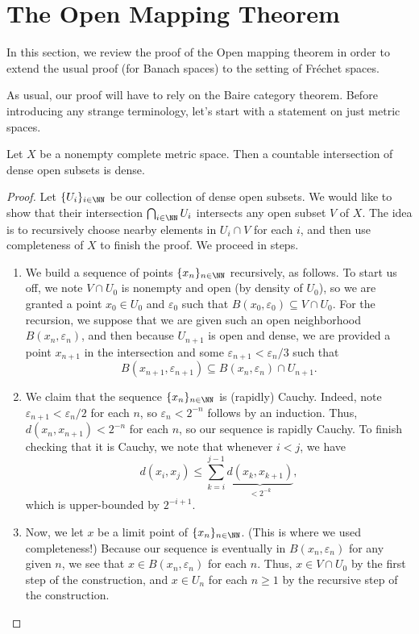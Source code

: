 \documentclass[notes.tex]{subfiles}
\begin{document}
\section{The Open Mapping Theorem}
In this section, we review the proof of the Open mapping theorem in order to extend the usual proof (for Banach spaces) to the setting of Fr\'echet spaces.

As usual, our proof will have to rely on the Baire category theorem. Before introducing any strange terminology, let's start with a statement on just metric spaces.
\begin{lemma} \label{lem:baire-cat-start}
	Let $X$ be a nonempty complete metric space. Then a countable intersection of dense open subsets is dense.
\end{lemma}
\begin{proof}
	Let $\{U_i\}_{i\in\NN}$ be our collection of dense open subsets. We would like to show that their intersection $\bigcap_{i\in\NN}U_i$ intersects any open subset $V$ of $X$. The idea is to recursively choose nearby elements in $U_i\cap V$ for each $i$, and then use completeness of $X$ to finish the proof. We proceed in steps.
	\begin{enumerate}
		\item We build a sequence of points $\{x_n\}_{n\in\NN}$ recursively, as follows. To start us off, we note $V\cap U_0$ is nonempty and open (by density of $U_0$), so we are granted a point $x_0\in U_0$ and $\varepsilon_0$ such that $B(x_0,\varepsilon_0)\subseteq V\cap U_0$. For the recursion, we suppose that we are given such an open neighborhood $B(x_n,\varepsilon_n)$, and then because $U_{n+1}$ is open and dense, we are provided a point $x_{n+1}$ in the intersection and some $\varepsilon_{n+1}<\varepsilon_n/3$ such that
		\[B(x_{n+1},\varepsilon_{n+1})\subseteq B(x_n,\varepsilon_n)\cap U_{n+1}.\]

		\item We claim that the sequence $\{x_n\}_{n\in\NN}$ is (rapidly) Cauchy. Indeed, note $\varepsilon_{n+1}<\varepsilon_n/2$ for each $n$, so $\varepsilon_n<2^{-n}$ follows by an induction. Thus, $d(x_n,x_{n+1})<2^{-n}$ for each $n$, so our sequence is rapidly Cauchy. To finish checking that it is Cauchy, we note that whenever $i<j$, we have
		\[d(x_i,x_j)\le\sum_{k=i}^{j-1}\underbrace{d(x_k,x_{k+1})}_{<2^{-k}},\]
		which is upper-bounded by $2^{-i+1}$.

		\item Now, we let $x$ be a limit point of $\{x_n\}_{n\in\NN}$. (This is where we used completeness!) Because our sequence is eventually in $B(x_n,\varepsilon_n)$ for any given $n$, we see that $x\in B(x_n,\varepsilon_n)$ for each $n$. Thus, $x\in V\cap U_0$ by the first step of the construction, and $x\in U_n$ for each $n\ge1$ by the recursive step of the construction.
		\qedhere
	\end{enumerate}
\end{proof}
\end{document}
